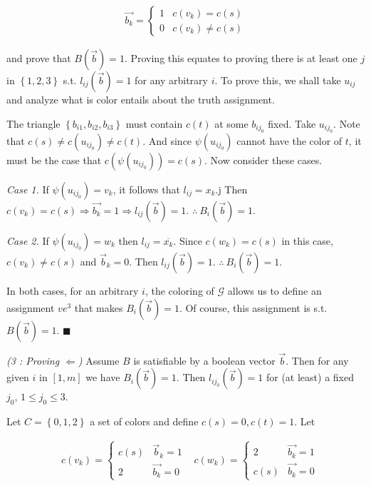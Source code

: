 \documentclass[a4paper, 12pt]{article}
\begin{document}
\begin{align*}
    \overrightarrow{b_k} = \begin{cases}
        1 & c(v_k) = c(s) \\ 
        0 & c(v_k) \neq c(s)
    \end{cases}
\end{align*}

and prove that $B(\overrightarrow{b}) = 1$. Proving this equates to proving
there is at least one $j$ in $\left\{ 1, 2, 3 \right\} $ s.t.
$l_{ij}(\overrightarrow{b}) = 1$ for any arbitrary $i$. To prove this, we shall
take $u_{ij}$ and analyze what is color entails about the truth assignment.

The triangle $\left\{ b_{i 1}, b_{i 2}, b_{i 3} \right\} $ must contain $c(t)$
at some $b_{ij_0}$ fixed. Take $u_{ij_0}$. Note that $c(s) \neq c(u_{ij_0})
\neq c(t)$. And since $\psi(u_{ij_0})$ cannot have the color of $t$, it must be
the case that $c \left( \psi\left( u_{ij_0} \right)  \right) = c(s) $. Now consider 
these cases. 

\textit{Case 1.} If $\psi(u_{ij_0}) = v_k$, it follows that $l_{ij} = x_k$.j
Then $c(v_k) = c(s) \Rightarrow \overrightarrow{b_k} = 1 \Rightarrow l_{ij}(\overrightarrow{b}) = 1 $. $\therefore ~ B_i (\overrightarrow{b}) = 1$.

\textit{Case 2.} If $\psi(u_{ij_0}) = w_k$ then $l_{ij} = \overline{x_k}$. Since 
$c(w_k) = c(s)$ in this case, $c(v_k) \neq c(s)$ and $\overrightarrow{b}_k = 0$.
Then $l_{ij}(\overrightarrow{b}) = 1$. $\therefore  ~ B_i(\overrightarrow{b}) = 1$. 

In both cases, for an arbitrary $i$, the coloring of $\mathcal{G}$ allows us 
to define an assignment $ve^3$ that makes $B_i(\overrightarrow{b}) = 1$.
Of course, this assignment is s.t. $B(\overrightarrow{b}) = 1$. $\blacksquare$


\pagebreak


\textit{(3 : Proving $\Leftarrow$)} Assume $B$ is satisfiable by a boolean
vector $\overrightarrow{b}$. Then for any given $i$ in $[1, m]$ we have
$B_i(\overrightarrow{b}) = 1$. Then $l_{ij_{0}}(\overrightarrow{b}) = 1$ for
(at least) a fixed $j_0$, $1 \leq j_0 \leq 3$. 

Let $C = \left\{ 0, 1, 2 \right\} $ a set of colors and define $c(s) = 0, c(t) = 1$. Let 

\begin{align*}
    &c(v_k) = \begin{cases}
        c(s) & \overrightarrow{b}_k = 1 \\ 
        2    & \overrightarrow{b_k} = 0
    \end{cases} & c(w_k) = \begin{cases}
    2 &\overrightarrow{b_k} = 1 \\ 
    c(s) &\overrightarrow{b_k} = 0
    \end{cases}
\end{align*}
\end{document}
